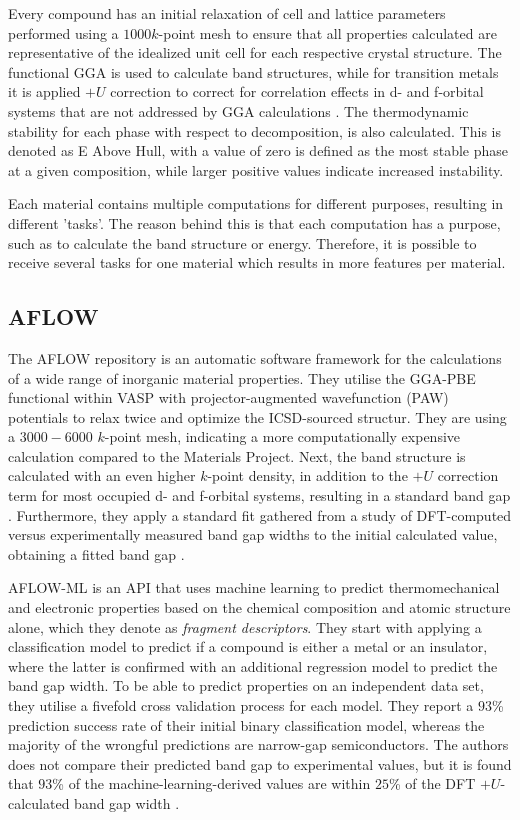 Every compound has an initial relaxation of cell and lattice parameters performed using a $1000 k$-point mesh to ensure that all properties calculated are representative of the idealized unit cell for each respective crystal structure. The functional GGA is used to calculate band structures, while for transition metals it is applied $+U$ correction to correct for correlation effects in d- and f-orbital systems that are not addressed by GGA calculations \cite{Wang2006}. The thermodynamic stability for each phase with respect to decomposition, is also calculated. This is denoted as E Above Hull, with a value of zero is defined as the most stable phase at a given composition, while larger positive values indicate increased instability.

Each material contains multiple computations for different purposes, resulting in different 'tasks'. The reason behind this is that each computation has a purpose, such as to calculate the band structure or energy. Therefore, it is possible to receive several tasks for one material which results in more features per material.

\subsection{AFLOW}

The AFLOW\cite{Curtarolo2012, Curtarolo2012a, Calderon2015} repository is an automatic software framework for the calculations of a wide range of inorganic material properties. They utilise the GGA-PBE functional within VASP with projector-augmented wavefunction (PAW) potentials to relax twice and optimize the ICSD-sourced structur. They are using a $3000-6000$ $k$-point mesh, indicating a more computationally expensive calculation compared to the Materials Project. Next, the band structure is calculated with an even higher $k$-point density, in addition to the $+U$ correction term for most occupied d- and f-orbital systems, resulting in a standard band gap \cite{Setyawan2010}. Furthermore, they apply a standard fit gathered from a study of DFT-computed versus experimentally measured band gap widths to the initial calculated value, obtaining a fitted band gap \cite{Setyawan2011}.

AFLOW-ML \cite{Isayev2017} is an API that uses machine learning to predict thermomechanical and electronic properties based on the chemical composition and atomic structure alone, which they denote as \textit{fragment descriptors}. They start with applying a classification model to predict if a compound is either a metal or an insulator, where the latter is confirmed with an additional regression model to predict the band gap width. To be able to predict properties on an independent data set, they utilise a fivefold cross validation process for each model. They report a $93$\% prediction success rate of their initial binary classification model, whereas the majority of the wrongful predictions are narrow-gap semiconductors. The authors does not compare their predicted band gap to experimental values, but it is found that $93$\% of the machine-learning-derived values are within $25$\% of the DFT $+U$-calculated band gap width \cite{Ferrenti2020}.


